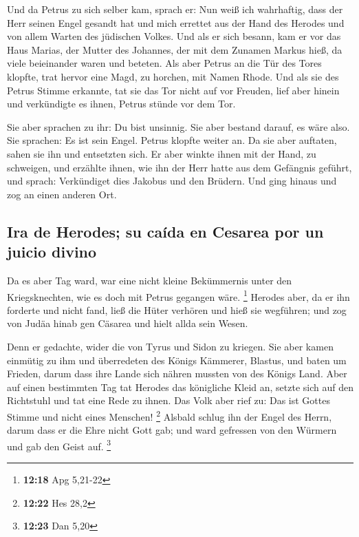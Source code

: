 Und da Petrus zu sich selber kam, sprach er: Nun weiß
ich wahrhaftig, dass der Herr seinen Engel gesandt hat und mich errettet
aus der Hand des Herodes und von allem Warten des jüdischen Volkes.
 Und als er sich besann, kam er vor das Haus Marias, der
Mutter des Johannes, der mit dem Zunamen Markus hieß, da viele
beieinander waren und beteten.  Als aber Petrus an die
Tür des Tores klopfte, trat hervor eine Magd, zu horchen, mit Namen
Rhode.  Und als sie des Petrus Stimme erkannte, tat sie
das Tor nicht auf vor Freuden, lief aber hinein und verkündigte es
ihnen, Petrus stünde vor dem Tor.

 Sie aber sprachen zu ihr: Du bist unsinnig. Sie aber
bestand darauf, es wäre also. Sie sprachen: Es ist sein Engel.
 Petrus klopfte weiter an. Da sie aber auftaten, sahen
sie ihn und entsetzten sich.  Er aber winkte ihnen mit
der Hand, zu schweigen, und erzählte ihnen, wie ihn der Herr hatte aus
dem Gefängnis geführt, und sprach: Verkündiget dies Jakobus und den
Brüdern. Und ging hinaus und zog an einen anderen Ort.

\hypertarget{ira-de-herodes-su-cauxedda-en-cesarea-por-un-juicio-divino}{%
\subsection{Ira de Herodes; su caída en Cesarea por un juicio
divino}\label{ira-de-herodes-su-cauxedda-en-cesarea-por-un-juicio-divino}}

 Da es aber Tag ward, war eine nicht kleine Bekümmernis
unter den Kriegsknechten, wie es doch mit Petrus gegangen wäre.
\footnote{\textbf{12:18} Apg 5,21-22}  Herodes aber, da
er ihn forderte und nicht fand, ließ die Hüter verhören und hieß sie
wegführen; und zog von Judäa hinab gen Cäsarea und hielt allda sein
Wesen.

 Denn er gedachte, wider die von Tyrus und Sidon zu
kriegen. Sie aber kamen einmütig zu ihm und überredeten des Königs
Kämmerer, Blastus, und baten um Frieden, darum dass ihre Lande sich
nähren mussten von des Königs Land.  Aber auf einen
bestimmten Tag tat Herodes das königliche Kleid an, setzte sich auf den
Richtstuhl und tat eine Rede zu ihnen.  Das Volk aber
rief zu: Das ist Gottes Stimme und nicht eines Menschen! \footnote{\textbf{12:22}
  Hes 28,2}  Alsbald schlug ihn der Engel des Herrn,
darum dass er die Ehre nicht Gott gab; und ward gefressen von den
Würmern und gab den Geist auf. \footnote{\textbf{12:23} Dan 5,20}

